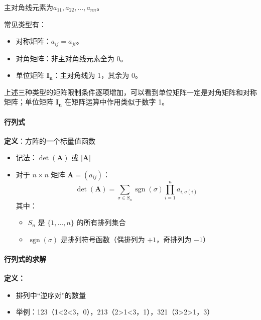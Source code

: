 \noindent 主对角线元素为\( a_{11}, a_{22}, \ldots, a_{nn} \)。
\begin{flushleft}
	常见类型有：
\end{flushleft}
\begin{itemize}
	\item 对称矩阵：\( a_{ij} = a_{ji} \)。
	\item 对角矩阵：非主对角线元素全为 0。
	\item 单位矩阵 \( \mathbf{I_n} \)：主对角线为 1，其余为 0。
\end{itemize}

\noindent 上述三种类型的矩阵限制条件逐项增加，可以看到单位矩阵一定是对角矩阵和对称矩阵；单位矩阵 \( \mathbf{I_n} \) 在矩阵运算中作用类似于数字 1。

\paragraph*{行列式}
\begin{flushleft}
	\textbf{定义}：方阵的一个标量值函数
\end{flushleft}

\begin{itemize}
	\item 记法：$\det(\mathbf{A})$ 或 $|\mathbf{A}|$
	\item 对于 $n \times n$ 矩阵 $\mathbf{A} = (a_{ij})$：
	\begin{equation}
		\det(\mathbf{A}) = \sum_{\sigma \in S_n} \operatorname{sgn}(\sigma) \prod_{i=1}^n a_{i,\sigma(i)}
	\end{equation}
	\noindent 其中：
	\begin{itemize}
		\item $S_n$ 是 $\{1, \ldots, n\}$ 的所有排列集合
		\item $\operatorname{sgn}(\sigma)$ 是排列符号函数（偶排列为 $+1$，奇排列为 $-1$）
	\end{itemize}
\end{itemize}

\paragraph*{行列式的求解} 

\begin{flushleft}
	\textbf{定义：}
\end{flushleft}

\begin{itemize}
	\item 排列中``逆序对''的数量
	\item 举例：123（1<2<3，0），213（2>1<3，1），321（3>2>1，3）
\end{itemize}

